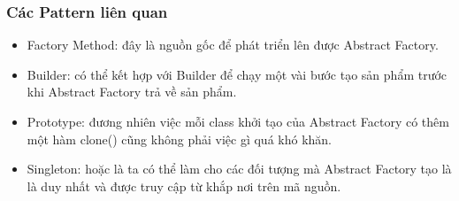 \subsubsection{Các Pattern liên quan}
\begin{itemize}
    \item Factory Method: đây là nguồn gốc để phát triển lên được Abstract Factory.
    \item Builder: có thể kết hợp với Builder để chạy một vài bước tạo sản phẩm trước khi Abstract Factory trả về sản phẩm.
    \item Prototype: đương nhiên việc mỗi class khởi tạo của Abstract Factory có thêm một hàm clone() cũng không phải việc gì quá khó khăn.
    \item Singleton: hoặc là ta có thể làm cho các đối tượng mà Abstract Factory tạo là là duy nhất và được truy cập từ khắp nơi trên mã nguồn.
\end{itemize}
